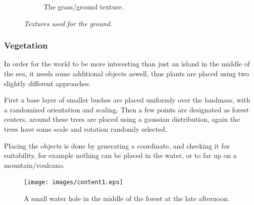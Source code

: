 \begin{figure}[H]
\begin{subfigure}{.5\textwidth}
  \caption{The grass/ground texture.}
  \label{fig:textureGrass}
\end{subfigure}
\caption[Texture blending]{\textit{Textures used for the ground.}}
\label{fig:textures}
\end{figure}

\newpage
\subsubsection{Vegetation}
In order for the world to be more interesting than just an island in the middle of the sea, it needs some additional objects aswell, thus plants are placed using two slightly different approaches.

First a base layer of smaller bushes are placed uniformly over the landmass, with a randomized orientation and scaling. Then a few points are designated as forest centers, around these trees are placed using a gaussian distribution, again the trees have some scale and rotation randomly selected.

Placing the objects is done by generating a coordinate, and checking it for suitability, for example nothing can be placed in the water, or to far up on a mountain/voulcano.

\begin{figure}[H]
  \centering
  \texttt{[image: images/content1.eps]}
  \caption{A small water hole in the middle of the forest at the late afternoon.}
  \label{fig:water_hole}
\end{figure}%

